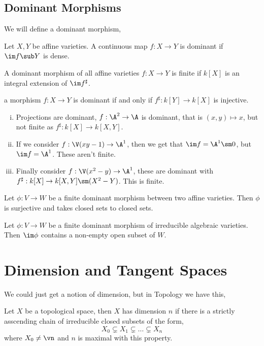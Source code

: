 
\subsection{Dominant Morphisms}
We will define a dominant morphism,
\begin{ndefi}
  Let $X, Y$ be affine varieties. A continuous map $f : X \to Y$ is dominant if $\im f \sub Y$ is dense.
\end{ndefi}

\noindent
A dominant morphism of all affine varieties $f:  X \to Y$ is finite if $k[X]$ is an integral extension of $\im f^\sharp$.

\begin{exercise}
  a morphism $f : X\to Y$ is dominant if and only if $f^\sharp : k[Y] \to k[X]$ is injective.
\end{exercise}

\begin{eg}
  \begin{enumerate}[(i)]
    \item   Projections are dominant, $f : \A^2 \to \A$ is dominant, that is $(x, y) \mapsto x$, but not finite as $f^\sharp : k[X] \to k[X, Y]$.
    \item If we consider $f : \V(xy - 1) \to \A^1$, then we get that $\im f = \A^1 \sm 0$, but $\im f = \A^1$. These aren't finite.
    \item Finally consider $f: \V(x^2 - y) \to \A^1$, these are dominant with $f^\sharp : k[X] \to k[X, Y]\sm (X^2 - Y)$. This is finite.
  \end{enumerate}
\end{eg}

\begin{nlemma}
  Let $\phi : V \to W$ be a finite dominant morphism between two affine varieties. Then $\phi$ is surjective and takes closed sets to closed sets.
\end{nlemma}
\begin{ncor}
  Let $\phi : V \to W$ be a finite dominant morphism of irreducible algebraic varieties. Then $\im \phi$ contains a non-empty open subset of $W$.
\end{ncor}

\section{Dimension and Tangent Spaces}
We could just get a notion of dimension, but in Topology we have this,
\begin{ndefi}
  Let $X$ be a topological space, then $X$ has dimension $n$ if there is a strictly asscending chain of irreducible closed subsets of the form,
  $$ X_0 \subsetneq X_1 \subsetneq \dots \subsetneq X_n $$
  where $X_0 \ne \vn$ and $n$ is maximal with this property.
\end{ndefi}

